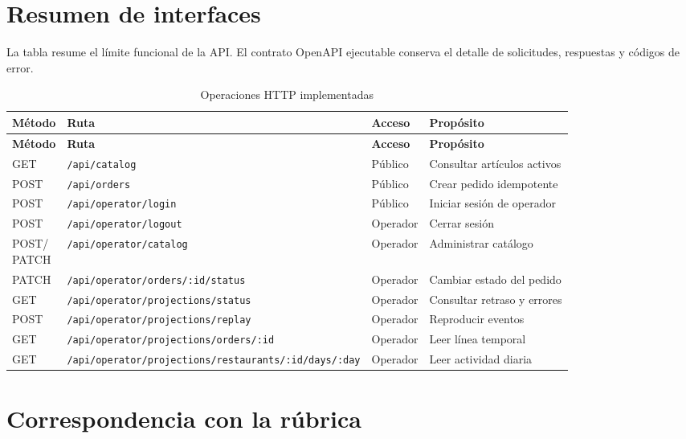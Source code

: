 \chapter{Resumen de interfaces}
\label{app:api}

La tabla resume el límite funcional de la API. El contrato OpenAPI ejecutable conserva el detalle de solicitudes, respuestas y códigos de error.

\begin{longtable}{@{}p{2.2cm}p{5.6cm}p{2.2cm}p{3.1cm}@{}}
  \caption{Operaciones HTTP implementadas}\label{tab:endpoints}\\
  \toprule
  \textbf{Método} & \textbf{Ruta} & \textbf{Acceso} & \textbf{Propósito} \\
  \midrule
  \endfirsthead
  \toprule
  \textbf{Método} & \textbf{Ruta} & \textbf{Acceso} & \textbf{Propósito} \\
  \midrule
  \endhead
  GET & \nolinkurl{/api/catalog} & Público & Consultar artículos activos \\
  POST & \nolinkurl{/api/orders} & Público & Crear pedido idempotente \\
  POST & \nolinkurl{/api/operator/login} & Público & Iniciar sesión de operador \\
  POST & \nolinkurl{/api/operator/logout} & Operador & Cerrar sesión \\
  \shortstack{POST/\\PATCH} & \nolinkurl{/api/operator/catalog} & Operador & Administrar catálogo \\
  PATCH & \nolinkurl{/api/operator/orders/:id/status} & Operador & Cambiar estado del pedido \\
  GET & \nolinkurl{/api/operator/projections/status} & Operador & Consultar retraso y errores \\
  POST & \nolinkurl{/api/operator/projections/replay} & Operador & Reproducir eventos \\
  GET & \nolinkurl{/api/operator/projections/orders/:id} & Operador & Leer línea temporal \\
  GET & \nolinkurl{/api/operator/projections/restaurants/:id/days/:day} & Operador & Leer actividad diaria \\
  \bottomrule
\end{longtable}

\chapter{Correspondencia con la rúbrica}
\label{app:rubrica}

